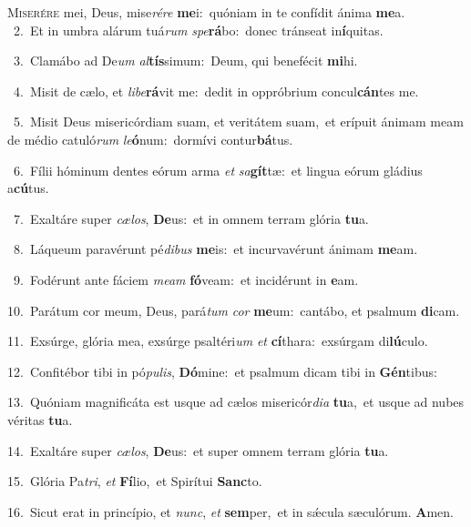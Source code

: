 \lettrine{\initial\textcolor{\initialcolor}{M}}{iserére} mei, Deus, mise\-\textit{ré}\-\textit{re} \textbf{me}\-i:~\star quóniam in te confídit ánima \textbf{me}\-a.\\
{\numbfont\textcolor{\numbcolor}{~2.}}~Et in umbra alárum tuá\textit{rum} \textit{spe}\-\textbf{rá}bo:~\star donec tránseat in\-\textbf{í}\-quitas.\par
{\numbfont\textcolor{\numbcolor}{~3.}}~Clamábo ad De\textit{um} \textit{al}\-\textbf{tís}simum:~\star Deum, qui benefécit \textbf{mi}\-hi.\par
{\numbfont\textcolor{\numbcolor}{~4.}}~Misit de cælo, et \textit{li}\-\textit{be}\textbf{rá}vit me:~\star dedit in oppróbrium concul\-\textbf{cán}\-tes me.\par
{\numbfont\textcolor{\numbcolor}{~5.}}~Misit Deus misericórdiam suam, et veritátem suam,~\dagger et erípuit ánimam meam de médio catuló\textit{rum} \textit{le}\-\textbf{ó}num:~\star dormívi contur\-\textbf{bá}\-tus.\par
{\numbfont\textcolor{\numbcolor}{~6.}}~Fílii hóminum dentes eórum arma \textit{et} \textit{sa}\-\textbf{gít}tæ:~\star et lingua eórum gládius a\-\textbf{cú}\-tus.\par
{\numbfont\textcolor{\numbcolor}{~7.}}~Exaltáre super \textit{cæ}\-\textit{los}, \textbf{De}\-us:~\star et in omnem terram glória \textbf{tu}\-a.\par
{\numbfont\textcolor{\numbcolor}{~8.}}~Láqueum paravérunt pé\-\textit{di}\-\textit{bus} \textbf{me}\-is:~\star et incurvavérunt ánimam \textbf{me}\-am.\par
{\numbfont\textcolor{\numbcolor}{~9.}}~Fodérunt ante fáciem \textit{me}\-\textit{am} \textbf{fó}\-veam:~\star et incidérunt in \textbf{e}\-am.\par
{\numbfont\textcolor{\numbcolor}{10.}}~Parátum cor meum, Deus, pará\textit{tum} \textit{cor} \textbf{me}\-um:~\star cantábo, et psalmum \textbf{di}\-cam.\par
{\numbfont\textcolor{\numbcolor}{11.}}~Exsúrge, glória mea, exsúrge psaltéri\textit{um} \textit{et} \textbf{cí}\-thara:~\star exsúrgam di\-\textbf{lú}\-culo.\par
{\numbfont\textcolor{\numbcolor}{12.}}~Confitébor tibi in pó\-\textit{pu}\-\textit{lis}, \textbf{Dó}\-mine:~\star et psalmum dicam tibi in \textbf{Gén}\-tibus:\par
{\numbfont\textcolor{\numbcolor}{13.}}~Quóniam magnificáta est usque ad cælos misericór\-\textit{di}\-\textit{a} \textbf{tu}\-a,~\star et usque ad nubes véritas \textbf{tu}\-a.\par
{\numbfont\textcolor{\numbcolor}{14.}}~Exaltáre super \textit{cæ}\-\textit{los}, \textbf{De}\-us:~\star et super omnem terram glória \textbf{tu}\-a.\par
{\numbfont\textcolor{\numbcolor}{15.}}~Glória Pa\-\textit{tri}\-, \textit{et} \textbf{Fí}\-lio,~\star et Spirítui \textbf{Sanc}\-to.\par
{\numbfont\textcolor{\numbcolor}{16.}}~Sicut erat in princípio, et \textit{nunc}\-, \textit{et} \textbf{sem}\-per,~\star et in sǽcula sæculórum. \textbf{A}\-men.\par

